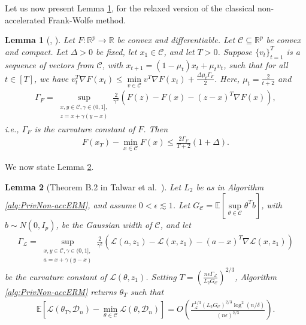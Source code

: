 \documentclass{article}
\newtheorem{lemma}{Lemma}
\begin{document}
Let us now present Lemma \ref{lemma:NonAccRel_FW}, for the relaxed version of the classical non-accelerated Frank-Wolfe method.
\begin{lemma}[\cite{NOPL}, \cite{Rev_FW_Prof_Free_Jaggi}]
\label{lemma:NonAccRel_FW}
Let $F : \mathbb{R}^p \rightarrow \mathbb{R}$ be convex and differentiable. Let $\mathcal{C} \subseteq \mathbb{R}^p$ be convex and compact. Let $\Delta > 0$ be fixed, let $x_1 \in \mathcal{C}$, and let $T > 0$. Suppose $\{v_t\}_{t = 1}^T$ is a sequence of vectors from $\mathcal{C}$, with $x_{t + 1} = (1 - \mu_t)x_t + \mu_t v_t$, such that for all $t \in [T]$, we have $v_t^T\nabla F(x_t) \leq \mathop{\min}\limits_{v \in \mathcal{C}}v^T\nabla F(x_t) + \frac{\Delta\mu_t\Gamma_{F}}{2}$. Here, $\mu_t = \frac{2}{t + 2}$ and
\begin{align*}
\Gamma_F = \mathop{\sup}\limits_{\substack{x, y \in \mathcal{C}, \gamma \in (0, 1], \\ z = x + \gamma(y - x)}}\frac{2}{\gamma^2}\left(F(z) - F(x) - (z - x)^T\nabla F(x)\right),
\end{align*}
i.e., $\Gamma_F$ is the curvature constant of $F$. Then
\begin{align*}
F(x_T) - \mathop{\min}\limits_{x \in \mathcal{C}}F(x) \leq \frac{2\Gamma_F}{T + 2}(1 + \Delta).
\end{align*}
\end{lemma}

We now state Lemma \ref{lemma:NOPLconvDPFW}.

\begin{lemma}[Theorem B.2 in Talwar et al.~\cite{NOPL}]
\label{lemma:NOPLconvDPFW}
Let $L_2$ be as in Algorithm \ref{alg:PrivNon-accERM}, and assume $0 < \epsilon \lesssim 1$. Let $G_{\mathcal{C}} = \mathbb{E}\left[\mathop{\sup}\limits_{\theta \in \mathcal{C}}\theta^T b\right]$, with $b \sim N(0, I_p)$, be the Gaussian width of $\mathcal{C}$, and let 
\begin{align}
\label{eq:curv_const_Talwar_DP}
\Gamma_{\mathcal{L}} = \mathop{\sup}\limits_{\substack{x, y \in \mathcal{C}, \gamma \in (0, 1], \\ a = x + \gamma(y - x)}}\frac{2}{\gamma^2}\left(\mathcal{L}(a, z_1) - \mathcal{L}(x, z_1) - (a - x)^T\nabla \mathcal{L}(x, z_1)\right)
\end{align}
be the curvature constant of $\mathcal{L}(\theta, z_1)$. Setting $T = \left(\frac{n\epsilon\Gamma_{\mathcal{L}}}{L_2G_{\mathcal{C}}}\right)^{2/3}$, Algorithm \ref{alg:PrivNon-accERM} returns $\theta_T$ such that
\begin{align*}
\mathbb{E}\left[\mathcal{L}(\theta_T, \mathcal{D}_n) - \mathop{\min}\limits_{\theta \in \mathcal{C}}\mathcal{L}(\theta, \mathcal{D}_n)\right] = O\left(\frac{\Gamma_{\mathcal{L}}^{1/3}(L_2G_{\mathcal{C}})^{2/3}\log^2(n/\delta)}{(n\epsilon)^{2/3}}\right).
\end{align*}
\end{lemma}
\end{document}
